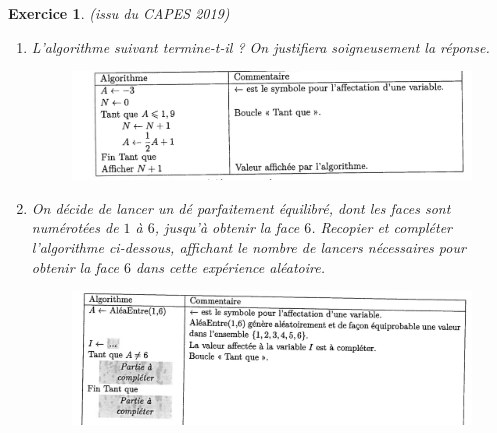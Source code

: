 \documentclass[11pt,a4paper]{article}
\newtheorem{ex}{Exercice}
\begin{document}
\begin{ex}\label{Capes}(issu du CAPES 2019)
\begin{enumerate}
\item L'algorithme suivant termine-t-il ? On justifiera soigneusement la réponse. \begin{figure}[H]
\centering \includegraphics[scale=0.3]{vrai-faux.png}
\end{figure}

\item  On décide de lancer un dé parfaitement équilibré, dont les faces sont numérotées de $1$ à $6$, jusqu'à obtenir la face $6$. Recopier et compléter l'algorithme ci-dessous, affichant le nombre de lancers nécessaires pour obtenir la face $6$ dans cette expérience aléatoire.  \begin{figure}[H]
\centering \includegraphics[scale=0.3]{de.png}

\end{figure}

\end{enumerate}
\end{ex}


 
\end{document}
